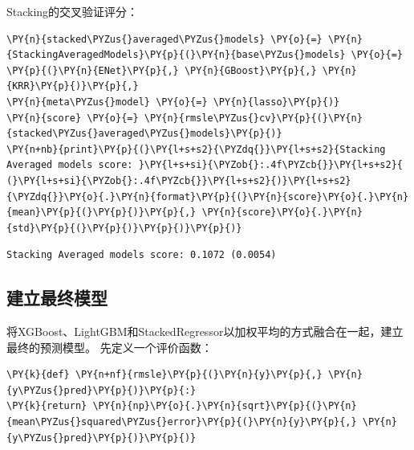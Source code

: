 \documentclass[no-math]{YangThesis}
\begin{document}
Stacking的交叉验证评分：

\begin{tcolorbox}[breakable, size=fbox, boxrule=1pt, pad at break*=1mm,colback=cellbackground, colframe=cellborder]
	\begin{Verbatim}[commandchars=\\\{\}]
\PY{n}{stacked\PYZus{}averaged\PYZus{}models} \PY{o}{=} \PY{n}{StackingAveragedModels}\PY{p}{(}\PY{n}{base\PYZus{}models} \PY{o}{=} \PY{p}{(}\PY{n}{ENet}\PY{p}{,} \PY{n}{GBoost}\PY{p}{,} \PY{n}{KRR}\PY{p}{)}\PY{p}{,}
\PY{n}{meta\PYZus{}model} \PY{o}{=} \PY{n}{lasso}\PY{p}{)}
\PY{n}{score} \PY{o}{=} \PY{n}{rmsle\PYZus{}cv}\PY{p}{(}\PY{n}{stacked\PYZus{}averaged\PYZus{}models}\PY{p}{)}
\PY{n+nb}{print}\PY{p}{(}\PY{l+s+s2}{\PYZdq{}}\PY{l+s+s2}{Stacking Averaged models score: }\PY{l+s+si}{\PYZob{}:.4f\PYZcb{}}\PY{l+s+s2}{ (}\PY{l+s+si}{\PYZob{}:.4f\PYZcb{}}\PY{l+s+s2}{)}\PY{l+s+s2}{\PYZdq{}}\PY{o}{.}\PY{n}{format}\PY{p}{(}\PY{n}{score}\PY{o}{.}\PY{n}{mean}\PY{p}{(}\PY{p}{)}\PY{p}{,} \PY{n}{score}\PY{o}{.}\PY{n}{std}\PY{p}{(}\PY{p}{)}\PY{p}{)}\PY{p}{)}
	\end{Verbatim}
\end{tcolorbox}

\begin{Verbatim}[commandchars=\\\{\}]
Stacking Averaged models score: 0.1072 (0.0054)
\end{Verbatim}

\hypertarget{ux5efaux7acbux6700ux7ec8ux6a21ux578b}{%
	\subsection{建立最终模型}\label{ux5efaux7acbux6700ux7ec8ux6a21ux578b}}

将XGBoost、LightGBM和StackedRegressor以加权平均的方式融合在一起，建立最终的预测模型。
先定义一个评价函数：

\begin{tcolorbox}[breakable, size=fbox, boxrule=1pt, pad at break*=1mm,colback=cellbackground, colframe=cellborder]
	\begin{Verbatim}[commandchars=\\\{\}]
\PY{k}{def} \PY{n+nf}{rmsle}\PY{p}{(}\PY{n}{y}\PY{p}{,} \PY{n}{y\PYZus{}pred}\PY{p}{)}\PY{p}{:}
\PY{k}{return} \PY{n}{np}\PY{o}{.}\PY{n}{sqrt}\PY{p}{(}\PY{n}{mean\PYZus{}squared\PYZus{}error}\PY{p}{(}\PY{n}{y}\PY{p}{,} \PY{n}{y\PYZus{}pred}\PY{p}{)}\PY{p}{)}
	\end{Verbatim}
\end{tcolorbox}
\end{document}

